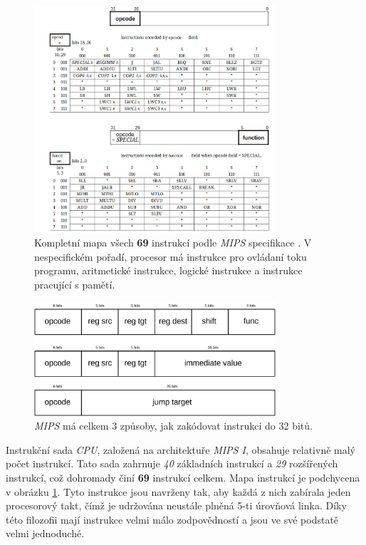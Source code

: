 \begin{figure}[hbt]
	\centering
	\includegraphics[width=0.8\textwidth]{obrazky-figures/instruction-map.png}
	\caption[\textit{MIPS I} instrukční sada]{Kompletní mapa všech \textbf{69} instrukcí podle \textit{MIPS} specifikace \cite{MIPSInsSpec}. V nespecifickém pořadí,
    procesor má instrukce pro ovládaní toku programu, aritmetické instrukce, logické instrukce a instrukce pracující s pamětí.}
	\label{instruction-map}
\end{figure}

\begin{figure}[hbt]
	\centering
	\includegraphics[width=0.8\textwidth]{obrazky-figures/instruction.png}
	\caption[\textit{MIPS I} typy instrukcí]{\textit{MIPS} má celkem 3 způsoby, jak zakódovat instrukci do 32 bitů.}
	\label{instruction}
\end{figure}

Instrukční sada \textit{CPU}, založená na architektuře \textit{MIPS I}, obsahuje relativně malý počet instrukcí. 
Tato sada zahrnuje \textit{40} základních instrukcí a \textit{29} rozšířených instrukcí, což dohromady činí \textbf{69} instrukcí celkem. Mapa instrukcí je podchycena v obrázku \ref{instruction-map}. 
Tyto instrukce jsou navrženy tak, aby každá z nich zabírala jeden procesorový takt, čímž je udržována neustále plněná 5-ti úrovňová linka. 
Díky této filozofii mají instrukce velmi málo zodpovědností a jsou ve své podstatě velmi jednoduché.

